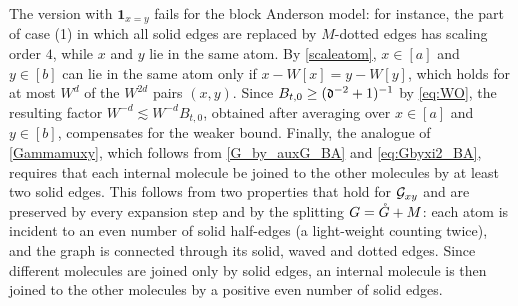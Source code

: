 \begin{itemize}
The version with $\mathbf 1_{x=y}$ fails for the block Anderson model: for instance, the part of case (1) in which all solid edges are replaced by $M$-dotted edges has scaling order $4$, while $x$ and $y$ lie in the same atom. By \eqref{scaleatom}, $x\in[a]$ and $y\in[b]$ can lie in the same atom only if $x-W[x]=y-W[y]$, which holds for at most $W^d$ of the $W^{2d}$ pairs $(x,y)$. Since $B_{t,0}\ge (\fd^{-2}+1)^{-1}$ by \eqref{eq:WO}, the resulting factor $W^{-d}\lesssim W^{-d}B_{t,0}$, obtained after averaging over $x\in[a]$ and $y\in[b]$, compensates for the weaker bound. Finally, the analogue of \eqref{Gammamuxy}, which follows from \eqref{G_by_auxG_BA} and \eqref{eq:Gbyxi2_BA}, requires that each internal molecule be joined to the other molecules by at least two solid edges. This follows from two properties that hold for $\cal G_{xy}$ and are preserved by every expansion step and by the splitting $G=\Gc+M$: each atom is incident to an even number of solid half-edges (a light-weight counting twice), and the graph is connected through its solid, waved and dotted edges. Since different molecules are joined only by solid edges, an internal molecule is then joined to the other molecules by a positive even number of solid edges.


\end{itemize}
